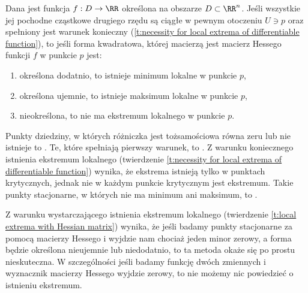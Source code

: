\begin{theorem}
    \label{t:local extrema with Hessian matrix}
    Dana jest funkcja $f : D \to \RR$ określona na obszarze $D \subset \RR^n$. Jeśli wszystkie jej pochodne cząstkowe drugiego rzędu są ciągłe w pewnym otoczeniu $U \ni p$ oraz spełniony jest warunek konieczny (\ref{t:necessity for local extrema of differentiable function}), to jeśli forma kwadratowa, której macierzą jest macierz Hessego funkcji $f$ w punkcie $p$ jest:
    \begin{enumerate}
        \item określona dodatnio, to istnieje minimum lokalne w punkcie $p$,
        \item określona ujemnie, to istnieje maksimum lokalne w punkcie $p$,
        \item nieokreślona, to nie ma ekstremum lokalnego w punkcie $p$.
    \end{enumerate}
\end{theorem}

\begin{remark}
    Punkty dziedziny, w których różniczka jest tożsamościowa równa zeru lub nie istnieje to . Te, które spełniają pierwszy warunek, to . Z warunku koniecznego istnienia ekstremum lokalnego (twierdzenie \ref{t:necessity for local extrema of differentiable function}) wynika, że ekstrema istnieją tylko w punktach krytycznych, jednak nie w każdym punkcie krytycznym jest ekstremum. Takie punkty stacjonarne, w których nie ma minimum ani maksimum, to .

    Z warunku wystarczającego istnienia ekstremum lokalnego (twierdzenie \ref{t:local extrema with Hessian matrix}) wynika, że jeśli badamy punkty stacjonarne za pomocą macierzy Hessego i wyjdzie nam chociaż jeden minor zerowy, a forma będzie określona nieujemnie lub niedodatnio, to ta metoda okaże się po prostu nieskuteczna. W szczególności jeśli badamy funkcję dwóch zmiennych i wyznacznik macierzy Hessego wyjdzie zerowy, to nie możemy nic powiedzieć o istnieniu ekstremum.
\end{remark}

